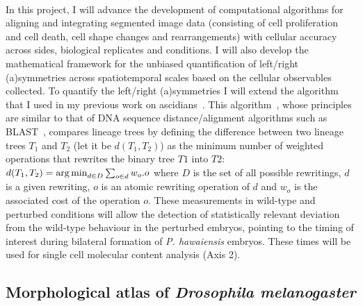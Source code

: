 \paragraph{}In this project, I will advance the development of computational algorithms for aligning and integrating segmented image data (consisting of cell proliferation and cell death, cell shape changes and rearrangements) with cellular accuracy across sides, biological replicates and conditions.
I will also develop the mathematical framework for the unbiased quantification of left/right (a)symmetries across spatiotemporal scales based on the cellular observables collected.
To quantify the left/right (a)symmetries I will extend the algorithm that I used in my previous work on ascidians~\cite{Guignard2020}.
This algorithm~\cite{Zhang1996}, whose principles are similar to that of DNA sequence distance/alignment algorithms such as BLAST~\cite{Altschul1990}, compares lineage trees by defining the difference between two lineage trees \(T_1\) and \(T_2\) (let it be \(d(T_1, T_2)\)) as the minimum number of weighted operations that rewrites the binary tree \(T1\) into \(T2\): \(d(T_1, T_2)=\operatorname*{arg\,min}_{d\in D}\sum_{o\in d} w_o.o\) where \(D\) is the set of all possible rewritings, \(d\) is a given rewriting, \(o\) is an atomic rewriting operation of \(d\) and \(w_o\) is the associated cost of the operation \(o\).
These measurements in wild-type and perturbed conditions will allow the detection of statistically relevant deviation from the wild-type behaviour in the perturbed embryos, pointing to the timing of interest during bilateral formation of \textit{P. hawaiensis} embryos.
These times will be used for single cell molecular content analysis (Axis 2).
\subsection{Morphological at\-las of \textit{Dro\-so\-phi\-la me\-la\-no\-gas\-ter}}
